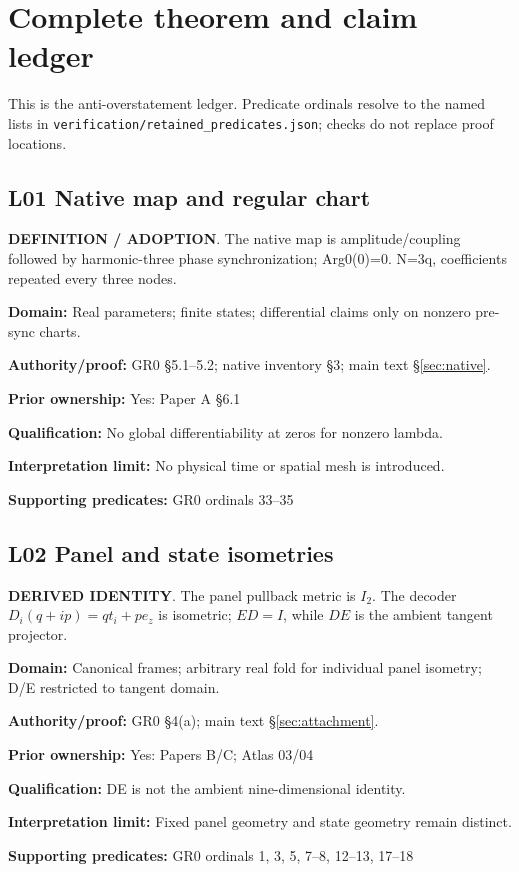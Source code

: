 \section{Complete theorem and claim ledger}\label{app:ledger}
This is the anti-overstatement ledger. Predicate ordinals resolve to the named lists in \texttt{verification/retained\_predicates.json}; checks do not replace proof locations.\par
\begingroup\footnotesize\raggedright
\par\noindent\begin{minipage}{\linewidth}
\subsection*{L01 Native map and regular chart}
\textbf{DEFINITION / ADOPTION}. The native map is amplitude/coupling followed by harmonic-three phase synchronization; Arg0(0)=0. N=3q, coefficients repeated every three nodes.\par
\textbf{Domain:} Real parameters; finite states; differential claims only on nonzero pre-sync charts.\par
\textbf{Authority/proof:} GR0 \S{}5.1--5.2; native inventory \S{}3; main text \S\ref{sec:native}.\par
\textbf{Prior ownership:} Yes: Paper A \S{}6.1\par
\textbf{Qualification:} No global differentiability at zeros for nonzero lambda.\par
\textbf{Interpretation limit:} No physical time or spatial mesh is introduced.\par
\textbf{Supporting predicates:} GR0 ordinals 33--35\par
\end{minipage}\par\medskip
\par\noindent\begin{minipage}{\linewidth}
\subsection*{L02 Panel and state isometries}
\textbf{DERIVED IDENTITY}. The panel pullback metric is \(I_2\). The decoder \(D_i(q+ip)=qt_i+pe_z\) is isometric; \(ED=I\), while \(DE\) is the ambient tangent projector.\par
\textbf{Domain:} Canonical frames; arbitrary real fold for individual panel isometry; D/E restricted to tangent domain.\par
\textbf{Authority/proof:} GR0 \S{}4(a); main text \S\ref{sec:attachment}.\par
\textbf{Prior ownership:} Yes: Papers B/C; Atlas 03/04\par
\textbf{Qualification:} DE is not the ambient nine-dimensional identity.\par
\textbf{Interpretation limit:} Fixed panel geometry and state geometry remain distinct.\par
\textbf{Supporting predicates:} GR0 ordinals 1, 3, 5, 7--8, 12--13, 17--18\par
\end{minipage}\par\medskip
